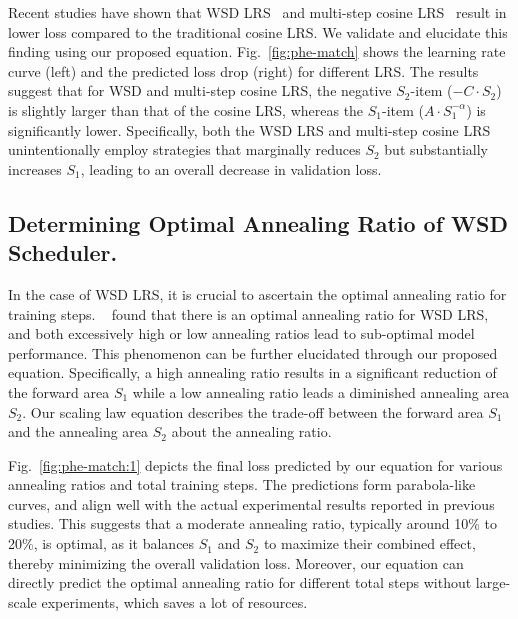 Recent studies have shown that WSD LRS~\citep{hu2024minicpm} and multi-step cosine LRS~\citep{deepseek-ai2024deepseek} result in lower loss compared to the traditional cosine LRS. 
We validate and elucidate this finding using our proposed equation. Fig.~\ref{fig:phe-match} shows the learning rate curve (left) and the predicted loss drop (right) for different LRS.
The results suggest that for WSD and multi-step cosine LRS, the negative $S_2$-item ($-C\cdot S_2$) is slightly larger than that of the cosine LRS, whereas the $S_1$-item ($A\cdot S_1^{-\alpha}$) is significantly lower.
Specifically, both the WSD LRS and multi-step cosine LRS unintentionally employ strategies that marginally reduces $S_2$ but substantially increases $S_1$, leading to an overall decrease in validation loss.


\subsection{\color{cyan} Determining Optimal Annealing Ratio of WSD Scheduler.}
\vspace{-5pt}
In the case of WSD LRS, it is crucial to ascertain the optimal annealing ratio for training steps. 
~\citet{hägele2024scaling} found that there is an optimal annealing ratio for WSD LRS, and both excessively high or low annealing ratios lead to sub-optimal model performance. 
This phenomenon can be further elucidated through our proposed equation. 
Specifically, a high annealing ratio results in a significant reduction of the forward area $S_1$ while a low annealing ratio leads a diminished annealing area $S_2$. 
Our scaling law equation describes the trade-off between the forward area $S_1$ and the annealing area $S_2$ about the annealing ratio.

Fig.~\ref{fig:phe-match:1} depicts the final loss predicted by our equation for various annealing ratios and total training steps. 
The predictions form parabola-like curves, and align well with the actual experimental results reported in previous studies.
This suggests that a moderate annealing ratio, typically around 10\% to 20\%, is optimal, as it balances $S_1$ and $S_2$ to maximize their combined effect, thereby minimizing the overall validation loss.
Moreover, our equation can directly predict the optimal annealing ratio for different total steps without large-scale experiments, which saves a lot of resources. 

